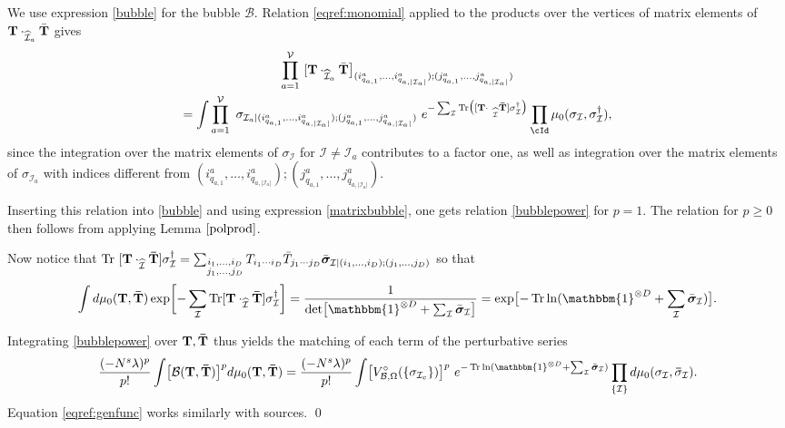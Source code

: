 \documentclass[aps,prd,10pt,notitlepage,nofootinbib,superscriptaddress,showkeys,showpacs]{revtex4-1}
\begin{document}
We use expression \eqref{bubble} for the bubble ${\mathcal{B}}$. Relation \eqref{eqref:monomial} applied to the products over the vertices of matrix elements of ${\bf T}\cdot_{{\widehat{\mathcal{I}}}_{a}}\bar {\bf T}$ gives
\begin{multline}
\prod_{a=1}^{\mathcal{V}}\ [ {\bf T}\cdot_{{\widehat{\mathcal{I}}}_{a}}\bar {\bf T}\bigr]_{ (i^a_{q_{a,1}},\dotsc, i^a_{q_{a,\lvert{\mathcal{I}}_a\rvert}}); (j^a_{q_{a,1}},\dotsc, j^a_{q_{a,\lvert{\mathcal{I}}_a\rvert}}) } \\
=
\int  \prod_{a=1}^{\mathcal{V}}\ \sigma_{{\mathcal{I}}_a\mid (i^a_{q_{a,1}},\dotsc, i^a_{q_{a,\lvert{\mathcal{I}}_a\rvert}}); (j^a_{q_{a,1}},\dotsc, j^a_{q_{a,\lvert{\mathcal{I}}_a\rvert}}) } 
\ e^{ - \sum_{\mathcal{I}}  \operatorname{Tr}\bigl( [{\bf T}\cdot_{\
{\widehat{\mathcal{I}}}}{\bf \bar T}] \sigma_{\mathcal{I}}^\dagger\bigr)  }
\prod_\cId\mu_{0}(\sigma_{\mathcal{I}},{\bf  \sigma_{\mathcal{I}}^\dagger}),
\end{multline}
since the integration over the matrix elements of $\sigma_{\mathcal{I}}$ for ${\mathcal{I}}\neq {\mathcal{I}}_a$ contributes to a factor one, as well as integration over the matrix elements of $\sigma_{{\mathcal{I}}_a}$ with indices different from $(i^a_{q_{a,1}},\dotsc, i^a_{q_{a,\lvert{\mathcal{I}}_a\rvert}}); (j^a_{q_{a,1}},\dotsc, j^a_{q_{a,\lvert{\mathcal{I}}_a\rvert}})$.

Inserting this relation into \eqref{bubble} and using expression \eqref{matrixbubble}, one gets relation \eqref{bubblepower} for $p=1$. The relation for $p\ge0$ then follows from applying Lemma $\ref{polprod}$.

Now notice that $\operatorname{Tr}\ [{\bf T}\cdot_{\widehat{\mathcal{I}}}{\bf \bar T}]\sigma_{\mathcal{I}}^\dagger = \sum_{ \substack {   {i_1,\dotsc, i_D} \\ {j_1,\dotsc, j_D}  } }T_{i_1\dotsb i_D}\bar T_{j_1\dotsb j_D}\bar{\bm{\sigma}}_{{\mathcal{I}}\mid(i_1,\dotsc, i_D);(j_1,\dotsc, j_D)}$ so that 
\begin{equation}
\int d\mu_{0}({\bf T}, {\bf \bar{T}})\exp\biggl[ - \sum_{\mathcal{I}}  \operatorname{Tr} [{\bf T}\cdot_{\widehat{\mathcal{I}}}{\bf \bar T}]\sigma_{\mathcal{I}} ^\dagger \biggr]
=\frac{1}{\det\bigl[ {\mathbbm{1}}^{\otimes D}+\sum_{\mathcal{I}}\bar{\bm{\sigma}}_{\mathcal{I}}  \bigr]}
=\exp\bigl[ -\operatorname{Tr} \ln ({\mathbbm{1}}^{\otimes D}+\sum_{\mathcal{I}}\bar{\bm{\sigma}}_{\mathcal{I}} ) \bigr].
\end{equation}

Integrating \eqref{bubblepower} over ${\bf T,\bar T}$ thus yields the matching of each term of the perturbative series
\begin{equation}
\label{eqref:pBubbles}
\frac{(-N^s\lambda)^p}{p!}\int \bigl[ {\mathcal{B}}({\bf T},{\bf \bar T}) \bigr]^p d\mu_{0}({\bf T}, {\bf \bar{T}})
=
\frac{(-N^s\lambda)^p}{p!}\int  \bigl[V_{{\mathcal{B}},\Omega}^{\circ}(\{\sigma_{{\mathcal{I}}_c}\})\bigr]^p\ e^{ -\operatorname{Tr} \ln ({\mathbbm{1}}^{\otimes D}+\sum_{\mathcal{I}}\bar{\bm{\sigma}}_{\mathcal{I}} ) }
\prod_{\{{\mathcal{I}}\}}d\mu_{0}(\sigma_{\mathcal{I}},{\bf \bar \sigma_{\mathcal{I}}}).
\end{equation}
Equation \eqref{eqref:genfunc} works similarly with sources.
\qed
\end{document}
